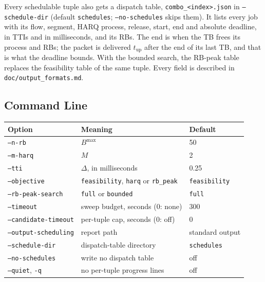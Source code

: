 \documentclass[11pt]{article}
\begin{document}
Every schedulable tuple also gets a dispatch table,
\texttt{combo\_<index>.json} in \texttt{--schedule-dir} (default
\texttt{schedules}; \texttt{--no-schedules} skips them). It lists every job
with its flow, segment, HARQ process, release, start, end and absolute
deadline, in TTIs and in milliseconds, and its RBs. The end is when the TB
frees its process and RBs; the packet is delivered $t_\mathrm{up}$ after the
end of its last TB, and that is what the deadline bounds. With the bounded
search, the RB-peak table replaces the feasibility table of the same tuple.
Every field is described in \texttt{doc/output\_formats.md}.

\subsection*{Command Line}

\begin{center}
\begin{tabular}{lll}
\toprule
\textbf{Option} & \textbf{Meaning} & \textbf{Default} \\
\midrule
\texttt{--n-rb} & $B^{\max}$ & 50 \\
\texttt{--m-harq} & $M$ & 2 \\
\texttt{--tti} & $\Delta$, in milliseconds & 0.25 \\
\texttt{--objective} & \texttt{feasibility}, \texttt{harq} or \texttt{rb\_peak} & \texttt{feasibility} \\
\texttt{--rb-peak-search} & \texttt{full} or \texttt{bounded} & \texttt{full} \\
\texttt{--timeout} & sweep budget, seconds (0: none) & 300 \\
\texttt{--candidate-timeout} & per-tuple cap, seconds (0: off) & 0 \\
\texttt{--output-scheduling} & report path & standard output \\
\texttt{--schedule-dir} & dispatch-table directory & \texttt{schedules} \\
\texttt{--no-schedules} & write no dispatch table & off \\
\texttt{--quiet}, \texttt{-q} & no per-tuple progress lines & off \\
\bottomrule
\end{tabular}
\end{center}
\end{document}
